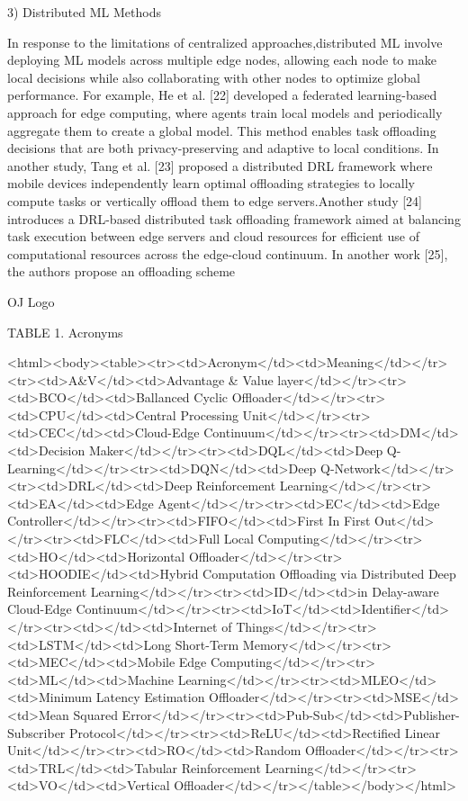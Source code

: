 \documentclass{article}
\begin{document}
3) Distributed ML Methods

In response to the limitations of centralized approaches,distributed ML involve deploying ML models across multiple edge nodes, allowing each node to make local decisions while also collaborating with other nodes to optimize global performance. For example, He et al. [22] developed a federated learning-based approach for edge computing, where agents train local models and periodically aggregate them to create a global model. This method enables task offloading decisions that are both privacy-preserving and adaptive to local conditions. In another study, Tang et al. [23] proposed a distributed DRL framework where mobile devices independently learn optimal offloading strategies to locally compute tasks or vertically offload them to edge servers.Another study [24] introduces a DRL-based distributed task offloading framework aimed at balancing task execution between edge servers and cloud resources for efficient use of computational resources across the edge-cloud continuum. In another work [25], the authors propose an offloading scheme

OJ Logo

TABLE 1. Acronyms

<html><body><table><tr><td>Acronym</td><td>Meaning</td></tr><tr><td>A\&V</td><td>Advantage \& Value layer</td></tr><tr><td>BCO</td><td>Ballanced Cyclic Offloader</td></tr><tr><td>CPU</td><td>Central Processing Unit</td></tr><tr><td>CEC</td><td>Cloud-Edge Continuum</td></tr><tr><td>DM</td><td>Decision Maker</td></tr><tr><td>DQL</td><td>Deep Q-Learning</td></tr><tr><td>DQN</td><td>Deep Q-Network</td></tr><tr><td>DRL</td><td>Deep Reinforcement Learning</td></tr><tr><td>EA</td><td>Edge Agent</td></tr><tr><td>EC</td><td>Edge Controller</td></tr><tr><td>FIFO</td><td>First In First Out</td></tr><tr><td>FLC</td><td>Full Local Computing</td></tr><tr><td>HO</td><td>Horizontal Offloader</td></tr><tr><td>HOODIE</td><td>Hybrid Computation Offloading via Distributed Deep Reinforcement Learning</td></tr><tr><td>ID</td><td>in Delay-aware Cloud-Edge Continuum</td></tr><tr><td>IoT</td><td>Identifier</td></tr><tr><td></td><td>Internet of Things</td></tr><tr><td>LSTM</td><td>Long Short-Term Memory</td></tr><tr><td>MEC</td><td>Mobile Edge Computing</td></tr><tr><td>ML</td><td>Machine Learning</td></tr><tr><td>MLEO</td><td>Minimum Latency Estimation Offloader</td></tr><tr><td>MSE</td><td>Mean Squared Error</td></tr><tr><td>Pub-Sub</td><td>Publisher-Subscriber Protocol</td></tr><tr><td>ReLU</td><td>Rectified Linear Unit</td></tr><tr><td>RO</td><td>Random Offloader</td></tr><tr><td>TRL</td><td>Tabular Reinforcement Learning</td></tr><tr><td>VO</td><td>Vertical Offloader</td></tr></table></body></html>
\end{document}
